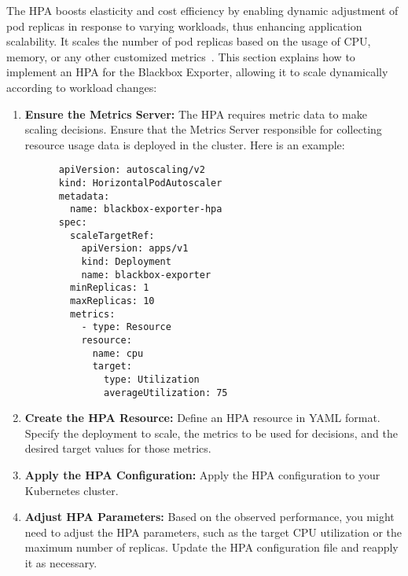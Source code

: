 The \ac{HPA} boosts elasticity and cost efficiency by enabling dynamic adjustment of pod replicas in response to varying workloads, thus enhancing application scalability. It scales the number of pod replicas based on the usage of CPU, memory, or any other customized metrics~\parencite{CustomMetricsAutoscaler}. This section explains how to implement an \ac{HPA} for the Blackbox Exporter, allowing it to scale dynamically according to workload changes: 
  \begin{enumerate}
  \item \textbf{Ensure the Metrics Server:}
  The \ac{HPA} requires metric data to make scaling decisions. Ensure that the Metrics Server responsible for collecting resource usage data is deployed in the cluster. Here is an example: 

  \begin{minipage}{\linewidth}
    \begin{lstlisting}
      apiVersion: autoscaling/v2
      kind: HorizontalPodAutoscaler
      metadata:
        name: blackbox-exporter-hpa
      spec:
        scaleTargetRef:
          apiVersion: apps/v1
          kind: Deployment
          name: blackbox-exporter
        minReplicas: 1
        maxReplicas: 10
        metrics:
          - type: Resource
          resource:
            name: cpu
            target:
              type: Utilization
              averageUtilization: 75
    \end{lstlisting}
  \end{minipage}
  
  \item \textbf{Create the \ac{HPA} Resource:}
  Define an \ac{HPA} resource in YAML format. Specify the deployment to scale, the metrics to be used for decisions, and the desired target values for those metrics. 
  \item \textbf{Apply the \ac{HPA} Configuration:}
  Apply the \ac{HPA} configuration to your Kubernetes cluster. 
  \item \textbf{Adjust \ac{HPA} Parameters:}
  Based on the observed performance, you might need to adjust the \ac{HPA} parameters, such as the target \ac{CPU} utilization or the maximum number of replicas. Update the \ac{HPA} configuration file and reapply it as necessary.
\end{enumerate}

